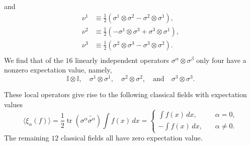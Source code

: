 \documentclass[prl,twocolumn,lengthcheck,superscriptaddress]{revtex4-1}
\newcommand{\tr}{\operatorname{tr}}
\theoremstyle{definition}
\theoremstyle{remark}
\begin{document}
and
\begin{equation}
	\begin{split}
		\nu^1 &\equiv  \frac12(\sigma^{1}\otimes \sigma^{2}-\sigma^{2}\otimes \sigma^{1}), \\
		\nu^2 &\equiv \frac12(-\sigma^{1}\otimes \sigma^{3}+\sigma^{3}\otimes \sigma^{1}),  \\
		\nu^3 &\equiv \frac12(\sigma^{2}\otimes \sigma^{3}-\sigma^{3}\otimes \sigma^{2}).  \\
	\end{split}
\end{equation}
We find that of the $16$ linearly independent operators $\sigma^\alpha \otimes \sigma^\beta$ only four have a nonzero expectation value, namely,
\begin{equation}
	\mathbb{I}\otimes \mathbb{I}, \quad \sigma^1 \otimes \sigma^1, \quad \sigma^2 \otimes \sigma^2, \quad \text{and} \quad \sigma^3 \otimes \sigma^3.
\end{equation}

These local operators give rise to the following classical fields with expectation values
\begin{equation}
	\langle\xi_\alpha(f)\rangle = \frac12\tr(\sigma^\alpha \widetilde{\sigma^\alpha}) \int f(x)\,dx = \begin{cases} \int f(x)\,dx, &\quad \alpha=0,\\-\int f(x)\,dx, &\quad \alpha\not=0.\end{cases}
\end{equation}
The remaining $12$ classical fields all have zero expectation value. 
\end{document}
